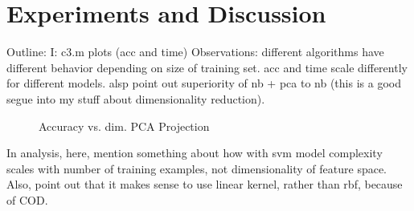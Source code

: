 \documentclass[]{article}
\begin{document}
\section{Experiments and Discussion}
Outline: 
I: c3.m plots (acc and time)
Observations: different algorithms have different behavior depending on size of training set. acc and time scale differently for different models.
alsp point out superiority of nb + pca to nb (this is a good segue into my stuff about dimensionality reduction).



\begin{figure}[!ht]
\centering
{}
\caption{Accuracy vs. dim. PCA Projection}
\label{fig:pca_acc_vs_proj_dim}
\end{figure}

In analysis, here, mention something about how with svm model complexity scales with number of training examples, not dimensionality of feature space. Also, point out that it makes sense to use linear kernel, rather than rbf, because of COD. 
\end{document}
